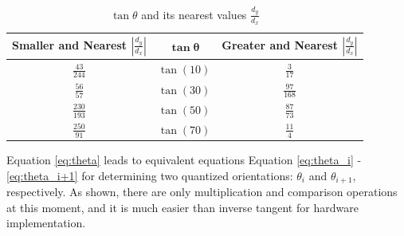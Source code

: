 \begin{table}[h]
	\centering
	\caption{$\tan\theta$ and its nearest values $\frac{d_y}{d_x}$ }
	\label{tab:tanphi_and_its_nearest_values}
	\begin{tabular}{|c|c|c|}
		\hline
	\textbf{Smaller and Nearest $|\frac{d_y}{d_x}|$} & $\mathbf{\tan\theta}$ & \textbf{Greater and Nearest $|\frac{d_y}{d_x}|$ }
		\\\hline
		$\frac{43}{244}$ &	$\tan(10)$ & $\frac{3}{17}$
		\\\hline
		$\frac{56}{57}$  & $\tan(30)$  & $\frac{97}{168}$
		\\\hline
		$\frac{230}{193}$ & $\tan(50)$ & $\frac{87}{73}$
		\\\hline
		$\frac{250}{91}$ & $\tan(70)$ & $\frac{11}{4}$
		\\\hline
	\end{tabular}
\end{table}
Equation \ref{eq:theta} leads to equivalent equations Equation \ref{eq:theta_i} - \ref{eq:theta_i+1}
for determining two quantized orientations: $\theta_i$ and $\theta_{i+1}$, respectively.
As shown, there are only multiplication and comparison operations at this
moment, and it is much easier than inverse tangent for hardware implementation.


